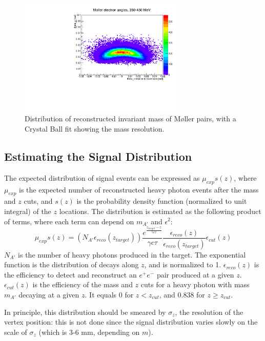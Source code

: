 \begin{figure}[ht]
\begin{center}
    \includegraphics[width=0.7\textwidth,page=18,angle=-90]{vertexing/figs/mollerplots}
\end{center}
    \caption{Distribution of reconstructed invariant mass of M{\o}ller pairs, with a Crystal Ball fit showing the mass resolution.}
    \label{fig:moller_mres}
\end{figure}

\clearpage
\subsection{Estimating the Signal Distribution}
\label{sec:signal_shape}
The expected distribution of signal events can be expressed as $\mu_{exp} s(z)$, where $\mu_{exp}$ is the expected number of reconstructed heavy photon events after the mass and $z$ cuts, and $s(z)$ is the probability density function (normalized to unit integral) of the $z$ locations.
The distribution is estimated as the following product of terms, where each term can depend on $m_{A'}$ and $\epsilon^2$:
\begin{equation}
\mu_{exp} s(z) = (N_{A'}\epsilon_{reco}(z_{target}))\frac{e^{\frac{z_{target}-z}{\gamma c \tau}}}{\gamma c \tau}\frac{\epsilon_{reco}(z)}{\epsilon_{reco}(z_{target})} \epsilon_{cut}(z)
\end{equation}
$N_{A'}$ is the number of heavy photons produced in the target.
The exponential function is the distribution of decays along $z$, and is normalized to 1.
$\epsilon_{reco}(z)$ is the efficiency to detect and reconstruct an $e^+e^-$ pair produced at a given $z$.
$\epsilon_{cut}(z)$ is the efficiency of the mass and $z$ cuts for a heavy photon with mass $m_{A'}$ decaying at a given $z$. It equals 0 for $z<z_{cut}$, and 0.838 for $z\ge z_{cut}$.

In principle, this distribution should be smeared by $\sigma_z$, the resolution of the vertex position: this is not done since the signal distribution varies slowly on the scale of $\sigma_z$ (which is 3-6 mm, depending on $m$).


